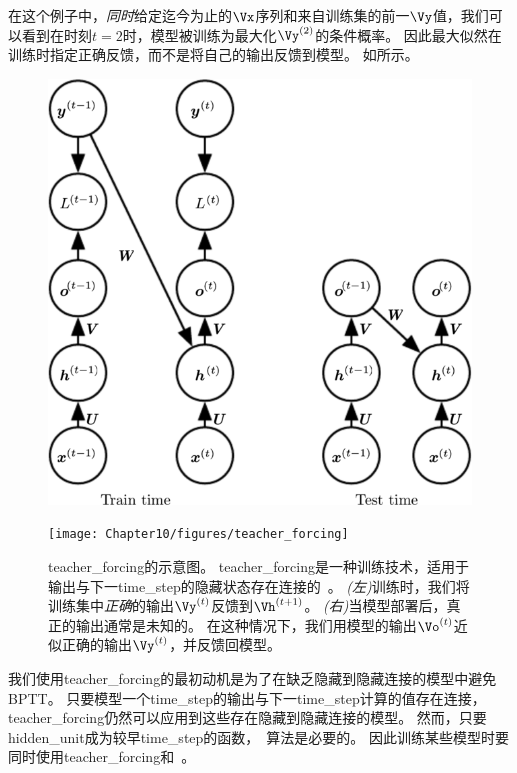 在这个例子中，\emph{同时}给定迄今为止的$\Vx$序列和来自训练集的前一$\Vy$值，我们可以看到在时刻$t=2$时，模型被训练为最大化$\Vy^{(2)}$的条件概率。
因此最大似然在训练时指定正确反馈，而不是将自己的输出反馈到模型。
如所示。
\begin{figure}[!htb]
\ifOpenSource
\centerline{\includegraphics[scale=0.5]{images/94.png}}
\else
\centerline{\texttt{[image: Chapter10/figures/teacher\_forcing]}}
\fi
\caption{\gls{teacher_forcing}的示意图。
\gls{teacher_forcing}是一种训练技术，适用于输出与下一\gls{time_step}的隐藏状态存在连接的~。
\emph{(左)}训练时，我们将训练集中\emph{正确}的输出$\Vy^{(t)}$反馈到$\Vh^{(t+1)}$。
\emph{(右)}当模型部署后，真正的输出通常是未知的。
在这种情况下，我们用模型的输出$\Vo^{(t)}$近似正确的输出$\Vy^{(t)}$，并反馈回模型。
}
\label{fig:chap10_teacher_forcing}
\end{figure}

我们使用\gls{teacher_forcing}的最初动机是为了在缺乏隐藏到隐藏连接的模型中避免\gls{BPTT}。
只要模型一个\gls{time_step}的输出与下一\gls{time_step}计算的值存在连接，\gls{teacher_forcing}仍然可以应用到这些存在隐藏到隐藏连接的模型。
然而，只要\gls{hidden_unit}成为较早\gls{time_step}的函数，~算法是必要的。
因此训练某些模型时要同时使用\gls{teacher_forcing}和~。

